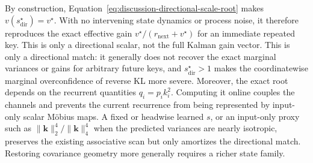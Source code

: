 \documentclass[11pt]{article}
\newcommand{\vct}[1]{\boldsymbol{#1}}
\begin{document}
By construction, Equation~\eqref{eq:discussion-directional-scale-root} makes
$v(s_{\mathrm{dir}}^\star)=v^\star$. With no intervening state dynamics or process noise, it
therefore reproduces the exact effective gain
$v^\star/(r_{\mathrm{next}}+v^\star)$ for an immediate repeated key. This is only a directional
scalar, not the full Kalman gain vector. This is only a directional match: it generally does not
recover the exact marginal variances or gains for arbitrary future keys, and
$s_{\mathrm{dir}}^\star>1$ makes the coordinatewise marginal overconfidence of reverse KL more
severe. Moreover, the exact root depends on the recurrent quantities $q_i=p_i k_i^2$. Computing it
online couples the channels and prevents the current recurrence from being represented by
input-only scalar M\"obius maps. A fixed or headwise learned $s$, or an input-only proxy such as
$\|\vct{k}\|_2^4/\|\vct{k}\|_4^4$ when the predicted variances are nearly isotropic, preserves
the existing associative scan but only amortizes the directional match. Restoring covariance
geometry more generally requires a richer state family.
\end{document}
